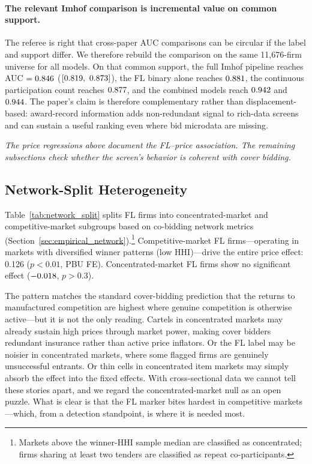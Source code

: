 

\paragraph{The relevant Imhof comparison is incremental value on common support.}
The referee is right that cross-paper AUC comparisons can be
circular if the label and support differ. We therefore rebuild
the comparison on the same 11{,}676-firm universe for all
models. On that common support, the full Imhof pipeline
reaches AUC $=0.846$ ($[0.819,\ 0.873]$), the FL
binary alone reaches $0.881$, the continuous
participation count reaches $0.877$, and the combined
models reach $0.942$ and $0.944$.
The paper's claim is therefore complementary rather than
displacement-based: award-record information adds
non-redundant signal to rich-data screens and can sustain a
useful ranking even where bid microdata are missing.






\medskip
\noindent\textit{The price regressions above document the FL--price
association. The remaining subsections check whether the screen's
behavior is coherent with cover bidding.}
\medskip

\subsection{Network-Split Heterogeneity}
\label{sec:results_network}

Table~\ref{tab:network_split} splits FL firms into
concentrated-market and competitive-market subgroups based on
co-bidding network metrics (Section~\ref{sec:empirical_network}).\footnote{Markets
above the winner-HHI sample median are classified as concentrated;
firms sharing at least two tenders are classified as repeat
co-participants.}
Competitive-market FL firms---operating in markets with diversified
winner patterns (low HHI)---drive the entire price effect: 0.126
($p < 0.01$, PBU FE). Concentrated-market FL firms show no significant
effect ($-0.018$, $p > 0.3$).

The pattern matches the standard cover-bidding prediction that the
returns to manufactured competition are highest where genuine
competition is otherwise active---but it is not the only reading. Cartels in
concentrated markets may already sustain high prices through market
power, making cover bidders redundant insurance rather than active
price inflators. Or the FL label may be noisier in concentrated
markets, where some flagged firms are genuinely unsuccessful entrants.
Or thin cells in concentrated item markets may simply absorb the
effect into the fixed effects. With cross-sectional data we cannot
tell these stories apart, and we regard the concentrated-market null as
an open puzzle. What is clear is that the FL marker bites hardest in
competitive markets---which, from a detection standpoint, is where it
is needed most.

